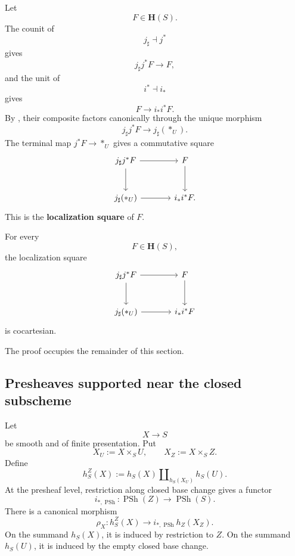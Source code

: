 \begin{construction}
\label{con:localization-square}
Let
\[
    F
    \in
    \mathbf H(S).
\]
The counit of
\[
    j_\sharp
    \dashv
    j^*
\]
gives
\[
    j_\sharp j^*F
    \longrightarrow
    F,
\]
and the unit of
\[
    i^*
    \dashv
    i_*
\]
gives
\[
    F
    \longrightarrow
    i_*i^*F.
\]
By
,
their composite factors canonically through the unique morphism
\[
    j_\sharp j^*F
    \longrightarrow
    j_\sharp(*_U).
\]
The terminal map \(j^*F\to *_U\) gives a commutative square
\[
\begin{tikzcd}[column sep=large, row sep=large]
    j_\sharp j^*F
        \arrow[r]
        \arrow[d]
    &
    F
        \arrow[d]
    \\
    j_\sharp(*_U)
        \arrow[r]
    &
    i_*i^*F.
\end{tikzcd}
\]
This is the \textbf{localization square} of \(F\).
\end{construction}

\begin{theorem}
\label{thm:spectral-morel-voevodsky-localization}
For every
\[
    F
    \in
    \mathbf H(S),
\]
the localization square
\[
\begin{tikzcd}[column sep=large, row sep=large]
    j_\sharp j^*F
        \arrow[r]
        \arrow[d]
    &
    F
        \arrow[d]
    \\
    j_\sharp(*_U)
        \arrow[r]
    &
    i_*i^*F
\end{tikzcd}
\]
is cocartesian.
\end{theorem}

The proof occupies the remainder of this section.

\subsection{Presheaves supported near the closed subscheme}

\begin{construction}
\label{con:presheaf-collapsing-open-part}
Let
\[
    X
    \longrightarrow
    S
\]
be smooth and of finite presentation.  Put
\[
    X_U
    :=
    X\times_SU,
    \qquad
    X_Z
    :=
    X\times_SZ.
\]
Define
\[
    h_S^Z(X)
    :=
    h_S(X)
    \amalg_{h_S(X_U)}
    h_S(U).
\]
At the presheaf level, restriction along closed base change gives a
functor
\[
    i_{*,\operatorname{PSh}}
    \colon
    \operatorname{PSh}(Z)
    \longrightarrow
    \operatorname{PSh}(S).
\]
There is a canonical morphism
\[
    \rho_X
    \colon
    h_S^Z(X)
    \longrightarrow
    i_{*,\operatorname{PSh}}h_Z(X_Z).
\]
On the summand \(h_S(X)\), it is induced by restriction to \(Z\).  On
the summand \(h_S(U)\), it is induced by the empty closed base change.
\end{construction}

